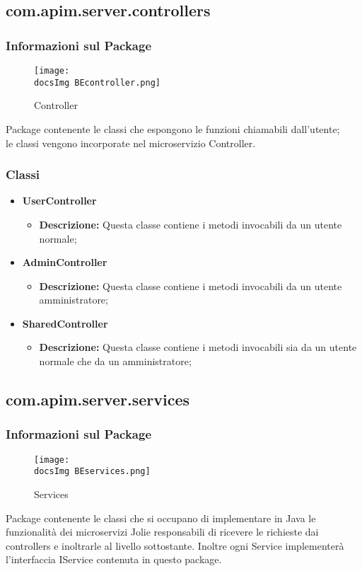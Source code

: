 {  \subsection{com.apim.server.controllers}{
    \subsubsection{Informazioni sul Package}
        \begin{figure}[H]
          \centering
          \texttt{[image: \\docsImg BEcontroller.png]}
          \caption{Controller}
          \label{Controller}
        \end{figure}
        Package contenente le classi che espongono le funzioni  chiamabili dall'utente;\\
        le classi vengono incorporate nel microservizio Controller.
        \subsubsection{Classi}
        \begin{itemize} \itemsep1pt
        \item \textbf{UserController}
        \begin{itemize}
        \item \textbf{Descrizione:} Questa classe contiene i metodi invocabili da un utente normale;
        \end{itemize}
        \item \textbf{AdminController}
        \begin{itemize}
        \item \textbf{Descrizione:} Questa classe contiene i metodi invocabili da un utente amministratore;
        \end{itemize}
        \item \textbf{SharedController}
        \begin{itemize}
        \item \textbf{Descrizione:} Questa classe contiene i metodi invocabili sia da un utente normale che da un amministratore;
        \end{itemize}
        \end{itemize}
  }
  \subsection{com.apim.server.services}{
    \subsubsection{Informazioni sul Package}
     \begin{figure}[H]
       \centering
       \texttt{[image: \\docsImg BEservices.png]}
       \caption{Services}
       \label{Services}
     \end{figure}
     Package contenente le classi che si occupano di implementare in Java le funzionalità dei microservizi Jolie responsabili di ricevere le richieste dai controllers e inoltrarle al livello sottostante. Inoltre ogni Service implementerà l'interfaccia IService contenuta in questo package.
}}
